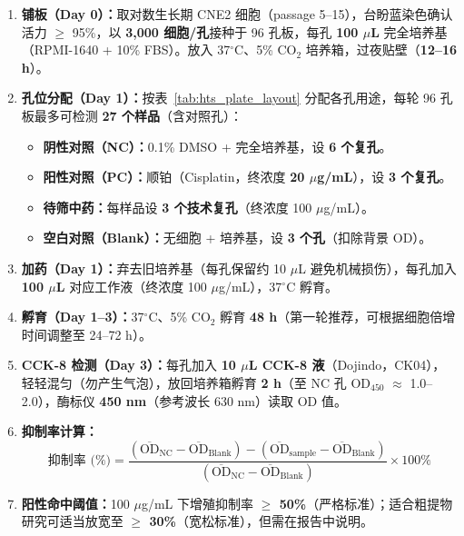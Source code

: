 \documentclass[12pt,a4paper,twoside]{article}
\begin{document}
\begin{enumerate}
  \item \textbf{铺板（Day 0）：}取对数生长期 CNE2 细胞（passage 5--15），台盼蓝染色确认活力 $\geq$ 95\%，以 \textbf{3,000 细胞/孔}接种于 96 孔板，每孔 \textbf{100 $\mu$L} 完全培养基（RPMI-1640 + 10\% FBS）。放入 37$^{\circ}$C、5\% CO$_2$ 培养箱，过夜贴壁（\textbf{12--16 h}）。
  \item \textbf{孔位分配（Day 1）：}按表~\ref{tab:hts_plate_layout} 分配各孔用途，每轮 96 孔板最多可检测 \textbf{27 个样品}（含对照孔）：
  \begin{itemize}
    \item \textbf{阴性对照（NC）：}0.1\% DMSO + 完全培养基，设 \textbf{6 个复孔}。
    \item \textbf{阳性对照（PC）：}顺铂（Cisplatin，终浓度 \textbf{20 $\mu$g/mL}），设 \textbf{3 个复孔}。
    \item \textbf{待筛中药：}每样品设 \textbf{3 个技术复孔}（终浓度 100 $\mu$g/mL）。
    \item \textbf{空白对照（Blank）：}无细胞 + 培养基，设 \textbf{3 个孔}（扣除背景 OD）。
  \end{itemize}
  \item \textbf{加药（Day 1）：}弃去旧培养基（每孔保留约 10 $\mu$L 避免机械损伤），每孔加入 \textbf{100 $\mu$L} 对应工作液（终浓度 100 $\mu$g/mL），37$^{\circ}$C 孵育。
  \item \textbf{孵育（Day 1--3）：}37$^{\circ}$C、5\% CO$_2$ 孵育 \textbf{48 h}（第一轮推荐，可根据细胞倍增时间调整至 24--72 h）。
  \item \textbf{CCK-8 检测（Day 3）：}每孔加入 \textbf{10 $\mu$L CCK-8 液}（Dojindo，CK04），轻轻混匀（勿产生气泡），放回培养箱孵育 \textbf{2 h}（至 NC 孔 OD$_{450}$ $\approx$ 1.0--2.0），酶标仪 \textbf{450 nm}（参考波长 630 nm）读取 OD 值。
  \item \textbf{抑制率计算：}
  \[
  \text{抑制率 (\%)} = \frac{(\overline{\text{OD}}_{\text{NC}} - \overline{\text{OD}}_{\text{Blank}}) - (\overline{\text{OD}}_{\text{sample}} - \overline{\text{OD}}_{\text{Blank}})}{(\overline{\text{OD}}_{\text{NC}} - \overline{\text{OD}}_{\text{Blank}})} \times 100\%
  \]
  \item \textbf{阳性命中阈值：}100 $\mu$g/mL 下增殖抑制率 \textbf{$\geq$ 50\%}（严格标准）；适合粗提物研究可适当放宽至 \textbf{$\geq$ 30\%}（宽松标准），但需在报告中说明。
\end{enumerate}
\end{document}
